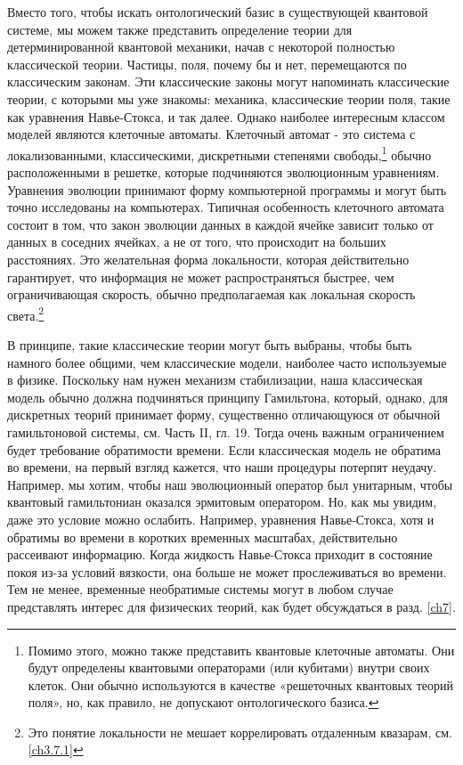 \documentclass[main.tex]{subfiles}
\begin{document}
Вместо того, чтобы искать онтологический базис в существующей квантовой системе, мы можем также представить определение теории для детерминированной квантовой механики, начав с некоторой полностью классической теории. Частицы, поля, почему бы и нет, перемещаются по классическим законам. Эти классические законы могут напоминать классические теории, с которыми мы уже знакомы: механика, классические теории поля, такие как уравнения Навье-Стокса, и так далее. Однако наиболее интересным классом моделей являются клеточные автоматы. Клеточный автомат - это система с локализованными, классическими, дискретными степенями свободы,\footnote{Помимо этого, можно также представить квантовые клеточные автоматы. Они будут определены квантовыми операторами (или кубитами) внутри своих клеток. Они обычно используются в качестве «решеточных квантовых теорий поля», но, как правило, не допускают онтологического базиса.} обычно расположенными в решетке, которые подчиняются эволюционным уравнениям. Уравнения эволюции принимают форму компьютерной программы и могут быть точно исследованы на компьютерах. Типичная особенность клеточного автомата состоит в том, что закон эволюции данных в каждой ячейке зависит только от данных в соседних ячейках, а не от того, что происходит на больших расстояниях. Это желательная форма локальности, которая действительно гарантирует, что информация не может распространяться быстрее, чем ограничивающая скорость, обычно предполагаемая как локальная скорость света.\footnote{Это понятие локальности не мешает коррелировать отдаленным квазарам, см. \ref{ch3.7.1}}

В принципе, такие классические теории могут быть выбраны, чтобы быть намного более общими, чем классические модели, наиболее часто используемые в физике. Поскольку нам нужен механизм стабилизации, наша классическая модель обычно должна подчиняться принципу Гамильтона, который, однако, для дискретных теорий принимает форму, существенно отличающуюся от обычной гамильтоновой системы, см. Часть II, гл. 19. Тогда очень важным ограничением будет требование обратимости времени. Если классическая модель не обратима во времени, на первый взгляд кажется, что наши процедуры потерпят неудачу. Например, мы хотим, чтобы наш эволюционный оператор был унитарным, чтобы квантовый гамильтониан оказался эрмитовым оператором. Но, как мы увидим, даже это условие можно ослабить. Например, уравнения Навье-Стокса, хотя и обратимы во времени в коротких временных масштабах, действительно рассеивают информацию. Когда жидкость Навье-Стокса приходит в состояние покоя из-за условий вязкости, она больше не может прослеживаться во времени. Тем не менее, временные необратимые системы могут в любом случае представлять интерес для физических теорий, как будет обсуждаться в разд. \ref{ch7}.
\end{document}
